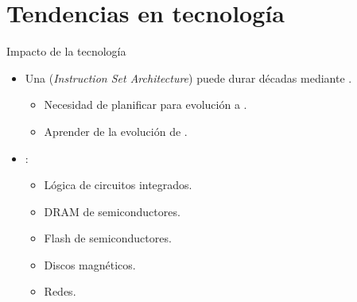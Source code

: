 \section{Tendencias en tecnología}

\begin{frame}[t]{Impacto de la tecnología}
\begin{itemize}
  \item Una 
        (\emph{Instruction Set Architecture}) puede durar décadas
        mediante .
    \begin{itemize}
      \item Necesidad de planificar para evolución a .
      \item Aprender de la evolución de .
    \end{itemize}

  \item {}:
    \begin{itemize}
      \item Lógica de circuitos integrados.
      \item DRAM de semiconductores.
      \item Flash de semiconductores.
      \item Discos magnéticos.
      \item Redes.
    \end{itemize}
\end{itemize}
\end{frame}

